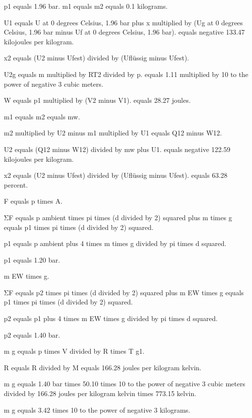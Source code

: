 p1 equals 1.96 bar.  
m1 equals m2 equals 0.1 kilograms.  

U1 equals U at 0 degrees Celsius, 1.96 bar plus x multiplied by (Ug at 0 degrees Celsius, 1.96 bar minus Uf at 0 degrees Celsius, 1.96 bar).  
equals negative 133.47 kilojoules per kilogram.  

x2 equals (U2 minus Ufest) divided by (Uflüssig minus Ufest).  

U2g equals m multiplied by RT2 divided by p.  
equals 1.11 multiplied by 10 to the power of negative 3 cubic meters.  

W equals p1 multiplied by (V2 minus V1).  
equals 28.27 joules.  

m1 equals m2 equals mw.  

m2 multiplied by U2 minus m1 multiplied by U1 equals Q12 minus W12.  

U2 equals (Q12 minus W12) divided by mw plus U1.  
equals negative 122.59 kilojoules per kilogram.  

x2 equals (U2 minus Ufest) divided by (Uflüssig minus Ufest).  
equals 63.28 percent.

F equals p times A.

ΣF equals p ambient times pi times (d divided by 2) squared plus m times g equals p1 times pi times (d divided by 2) squared.

p1 equals p ambient plus 4 times m times g divided by pi times d squared.

p1 equals 1.20 bar.

m EW times g.

ΣF equals p2 times pi times (d divided by 2) squared plus m EW times g equals p1 times pi times (d divided by 2) squared.

p2 equals p1 plus 4 times m EW times g divided by pi times d squared.

p2 equals 1.40 bar.

m g equals p times V divided by R times T g1.

R equals R divided by M equals 166.28 joules per kilogram kelvin.

m g equals 1.40 bar times 50.10 times 10 to the power of negative 3 cubic meters divided by 166.28 joules per kilogram kelvin times 773.15 kelvin.

m g equals 3.42 times 10 to the power of negative 3 kilograms.